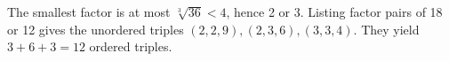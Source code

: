 The smallest factor is at most $\sqrt[3]{36}<4$, hence 2 or 3. Listing factor pairs of 18 or 12 gives the unordered triples $(2,2,9),(2,3,6),(3,3,4)$. They yield $3+6+3=\boxed{12}$ ordered triples.
